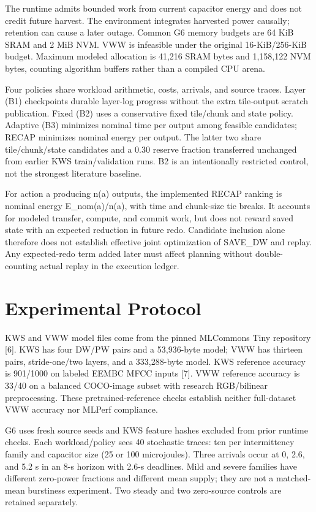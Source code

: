 \documentclass[journal,10pt]{IEEEtran}
\begin{document}
The runtime admits bounded work from current capacitor energy and does not credit future harvest. The environment integrates harvested power causally; retention can cause a later outage. Common G6 memory budgets are 64 KiB SRAM and 2 MiB NVM. VWW is infeasible under the original 16-KiB/256-KiB budget. Maximum modeled allocation is 41,216 SRAM bytes and 1,158,122 NVM bytes, counting algorithm buffers rather than a compiled CPU arena.

Four policies share workload arithmetic, costs, arrivals, and source traces. Layer (B1) checkpoints durable layer-log progress without the extra tile-output scratch publication. Fixed (B2) uses a conservative fixed tile/chunk and state policy. Adaptive (B3) minimizes nominal time per output among feasible candidates; RECAP minimizes nominal energy per output. The latter two share tile/chunk/state candidates and a 0.30 reserve fraction transferred unchanged from earlier KWS train/validation runs. B2 is an intentionally restricted control, not the strongest literature baseline.

For action a producing n(a) outputs, the implemented RECAP ranking is nominal energy E\_nom(a)/n(a), with time and chunk-size tie breaks. It accounts for modeled transfer, compute, and commit work, but does not reward saved state with an expected reduction in future redo. Candidate inclusion alone therefore does not establish effective joint optimization of SAVE\_DW and replay. Any expected-redo term added later must affect planning without double-counting actual replay in the execution ledger.

\section{Experimental Protocol}
KWS and VWW model files come from the pinned MLCommons Tiny repository [6]. KWS has four DW/PW pairs and a 53,936-byte model; VWW has thirteen pairs, stride-one/two layers, and a 333,288-byte model. KWS reference accuracy is 901/1000 on labeled EEMBC MFCC inputs [7]. VWW reference accuracy is 33/40 on a balanced COCO-image subset with research RGB/bilinear preprocessing. These pretrained-reference checks establish neither full-dataset VWW accuracy nor MLPerf compliance.

G6 uses fresh source seeds and KWS feature hashes excluded from prior runtime checks. Each workload/policy sees 40 stochastic traces: ten per intermittency family and capacitor size (25 or 100 microjoules). Three arrivals occur at 0, 2.6, and 5.2 s in an 8-s horizon with 2.6-s deadlines. Mild and severe families have different zero-power fractions and different mean supply; they are not a matched-mean burstiness experiment. Two steady and two zero-source controls are retained separately.
\end{document}
